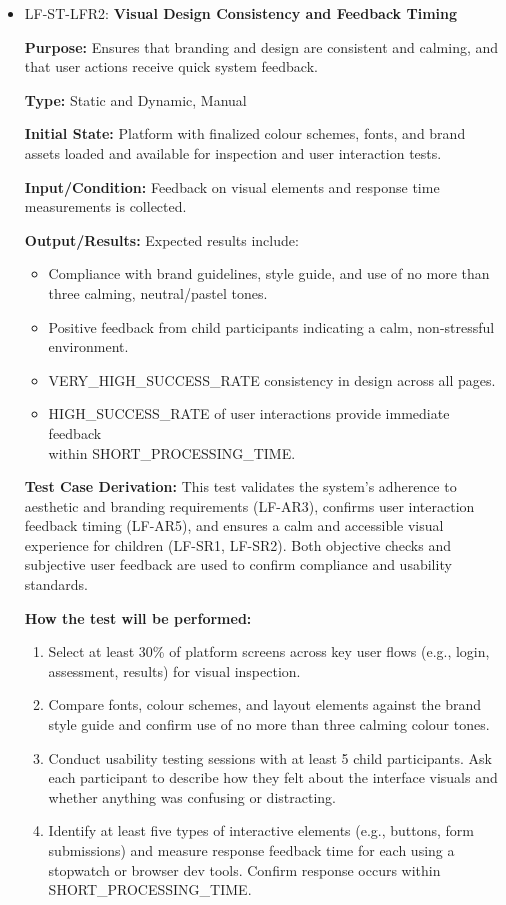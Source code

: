 \documentclass[12pt, titlepage]{article}
\begin{document}
\begin{itemize}
  \item LF-ST-LFR2: \textbf{Visual Design Consistency and Feedback Timing}
  \begin{mdframed}[linewidth=0.5mm] 
    \textbf{Purpose:} Ensures that branding and design are consistent and calming, and that user actions receive quick system feedback. \par
    \textbf{Type:} Static and Dynamic, Manual \par 
    \textbf{Initial State:} Platform with finalized colour schemes, fonts, and brand assets loaded and available for inspection and user interaction tests. \par 
    \textbf{Input/Condition:} Feedback on visual elements and response time measurements is collected. \par 
    \textbf{Output/Results:} Expected results include: 
    \begin{itemize} 
      \item Compliance with brand guidelines, style guide, and use of no more than three calming, neutral/pastel tones. 
      \item Positive feedback from child participants indicating a calm, non-stressful environment. 
      \item VERY\_HIGH\_SUCCESS\_RATE consistency in design across all pages. 
      \item HIGH\_SUCCESS\_RATE of user interactions provide immediate feedback \\ within SHORT\_PROCESSING\_TIME. 
    \end{itemize} \par 
    \textbf{Test Case Derivation:} This test validates the system’s adherence to aesthetic and branding requirements (LF-AR3), confirms user interaction feedback timing (LF-AR5), and ensures a calm and accessible visual experience for children (LF-SR1, LF-SR2). Both objective checks and subjective user feedback are used to confirm compliance and usability standards. \par
    \textbf{How the test will be performed:} 
    \begin{enumerate}[noitemsep] 
      \item Select at least 30\% of platform screens across key user flows (e.g., login, assessment, results) for visual inspection.
      \item Compare fonts, colour schemes, and layout elements against the brand style guide and confirm use of no more than three calming colour tones.
      \item Conduct usability testing sessions with at least 5 child participants. Ask each participant to describe how they felt about the interface visuals and whether anything was confusing or distracting.
      \item Identify at least five types of interactive elements (e.g., buttons, form \\ submissions) and measure response feedback time for each using a stopwatch or browser dev tools. Confirm response occurs within \\ SHORT\_PROCESSING\_TIME.
    \end{enumerate} 
  \end{mdframed}  
\end{itemize}
\end{document}
